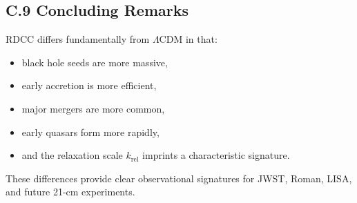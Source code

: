 \documentclass[11pt,a4paper]{article}
\begin{document}
\subsection*{C.9 Concluding Remarks}

RDCC differs fundamentally from $\Lambda$CDM in that:

\begin{itemize}
    \item black hole seeds are more massive,
    \item early accretion is more efficient,
    \item major mergers are more common,
    \item early quasars form more rapidly,
    \item and the relaxation scale $k_{\mathrm{rel}}$ imprints a characteristic signature.
\end{itemize}

These differences provide clear observational signatures for JWST, Roman, LISA, and future 
21-cm experiments.


\nocite{*}

\end{document}
